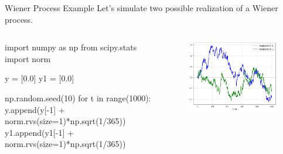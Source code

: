 \documentclass{beamer}
\begin{document}
\begin{frame}[fragile]{Wiener Process Example}
  Let's simulate two possible realization of a Wiener process.
  \begin{columns}
  \begin{ipython}
import numpy as np
from scipy.stats import norm

y = [0.0]
y1 = [0.0]

np.random.seed(10)
for t in range(1000):
  y.append(y[-1] +
    norm.rvs(size=1)*np.sqrt(1/365))
  y1.append(y1[-1] +
    norm.rvs(size=1)*np.sqrt(1/365))
\end{ipython}
  \begin{figure}[h]
    \begin{center}
      \includegraphics[width=0.90\linewidth]{wiener}
    \end{center}
  \end{figure}
  \end{columns}
\end{frame}
\end{document}
